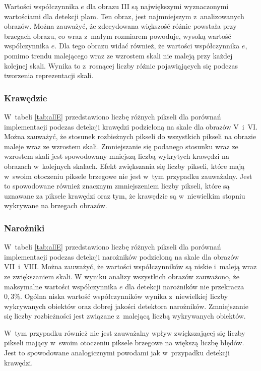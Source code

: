 Wartości współczynnika $ e $ dla obrazu III są największymi wyznaczonymi wartościami dla detekcji plam. Ten obraz, jest najmniejszym z~analizowanych obrazów. Można zauważyć, że zdecydowana większość różnic powstała przy brzegach obrazu, co wraz z~małym rozmiarem powoduje, wysoką wartość współczynnika $ e $. Dla tego obrazu widać również, że wartości współczynnika $ e $, pomimo trendu malejącego wraz ze wzrostem skali nie maleją przy każdej kolejnej skali. Wynika to z~rosnącej liczby różnic pojawiąjących się podczas tworzenia reprezentacji skali.


\subsubsection{Krawędzie}
\label{subsubsec:krawedzieTabele}

W~tabeli \ref{tab:allE} przedstawiono liczbę różnych pikseli dla porównań implementacji podczas detekcji krawędzi podzieloną na skale dla obrazów V~i~VI. Można zauważyć, że stosunek rozbieżnych pikseli do wszystkich pikseli na obrazie maleje wraz ze wzrostem skali. Zmniejszanie się podanego stosunku wraz ze wzrostem skali jest spowodowany mniejszą liczbą wykrytych krawędzi na obrazach w~kolejnych skalach. Efekt zwiększania się liczby pikseli, które mają w~swoim otoczeniu piksele brzegowe nie jest w~tym przypadku zauważalny. Jest to spowodowane również znacznym zmniejszeniem liczby pikseli, które są uznawane za piksele krawędzi oraz tym, że krawędzie są w~niewielkim stopniu wykrywane na brzegach obrazów.

\subsubsection{Narożniki}
\label{subsubsec:naroznikiTabele}

W~tabeli \ref{tab:allE} przedstawiono liczbę różnych pikseli dla porównań implementacji podczas detekcji narożników podzieloną na skale dla obrazów VII~i~VIII. Można zauważyć, że wartości współczynników są niskie i~maleją wraz ze zwiększaniem skali. W wyniku analizy wszystkich obrazów zauważono, że maksymalne wartości współczynnika $ e $ dla detekcji narożników nie przekracza $ 0,3 \% $. Ogólna niska wartość współczynników wynika z~niewielkiej liczby wykrywanych obiektów oraz dobrej jakości detektora narożników. Zmniejszanie się liczby rozbieżności jest związane z~malejącą liczbą wykrywanych obiektów.

W~tym przypadku również nie jest zauważalny wpływ zwiększającej się liczby pikseli mający w~swoim otoczeniu piksele brzegowe na większą liczbę błędów. Jest to spowodowane analogicznymi powodami jak w~przypadku detekcji krawędzi.

